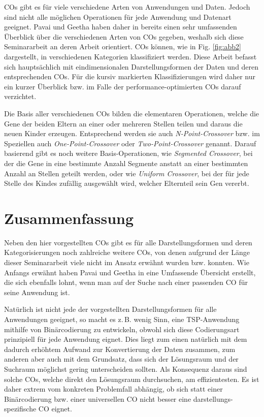 \documentclass{llncs}
\newcommand{\zB}{z.\,B. }
\begin{document}
COs gibt es für viele verschiedene Arten von Anwendungen und Daten. Jedoch sind nicht alle möglichen Operationen für jede Anwendung und Daten\-art ge\-ei\-gnet. Pavai und Geetha haben daher in \cite{Survey} bereits einen sehr umfassenden Überblick über die verschiedenen Arten von COs gegeben, weshalb sich diese Seminararbeit an deren Arbeit orientiert. COs können, wie in Fig. \ref{fig:abb2} dargestellt, in verschiedenen Kategorien klassifiziert werden. Diese Arbeit befasst sich hauptsächlich mit eindimensionalen Darstellungsformen der Daten und deren entsprechenden COs. Für die kursiv markierten Klassifizierungen wird daher nur ein kurzer Überblick bzw. im Falle der performance-optimierten COs darauf verzichtet.

Die Basis aller verschiedenen COs bilden die elementaren Operationen, wel\-che die Gene der beiden Eltern an einer oder mehreren Stellen teilen und daraus die neuen Kinder erzeugen. Entsprechend werden sie auch \textit{N-Point-Crossover} bzw. im Speziellen auch \textit{One-Point-Crossover} oder \textit{Two-Point-Crossover} ge\-nannt. Darauf basierend gibt es noch weitere Basis-Operationen, wie \textit{Segmented Cross\-over}, bei der die Gene in eine bestimmte Anzahl Segmente anstatt an einer bestimmten Anzahl an Stellen geteilt werden, \cite{GABasicIdeas} oder wie \textit{Uniform Crossover}, bei der für jede Stelle des Kindes zufällig ausgewählt wird, welcher Elternteil sein Gen vererbt.



\section{Zusammenfassung}
\label{sec:ZusFass}

	Neben den hier vorgestellten COs gibt es für alle Darstellungsformen und deren Kategorisierungen noch zahlreiche weitere COs, von denen aufgrund der Länge dieser Seminararbeit viele nicht im Ansatz erwähnt wurden bzw. konnten. Wie Anfangs erwähnt haben Pavai und Geetha in \cite{Survey} eine Umfassende Übersicht erstellt, die sich ebenfalls lohnt, wenn man auf der Suche nach einer passenden CO für seine Anwendung ist.
	
	Natürlich ist nicht jede der vorgestellten Darstellungsformen für alle Anwendungen geeignet, so macht es \zB wenig Sinn, eine TSP-Anwendung mithilfe von Binärcodierung zu entwickeln, obwohl sich diese Codierungsart prinzipiell für jede Anwendung eignet. Dies liegt zum einen natürlich mit dem dadurch erhöhtem Aufwand zur Konvertierung der Daten zusammen, zum anderen aber auch mit dem Grundsatz, dass sich der Lösungsraum und der Suchraum möglichst gering unterscheiden sollten. \cite{TacklingRealCodedGA} Als Konsequenz daraus sind solche COs, welche direkt den Lösungsraum durchsuchen, am effizientesten. Es ist daher extrem vom konkreten Problemfall abhängig, ob sich statt einer Binärcodierung bzw. einer universellen CO nicht besser eine darstellungs-spezifische CO eignet.
	
\end{document}
